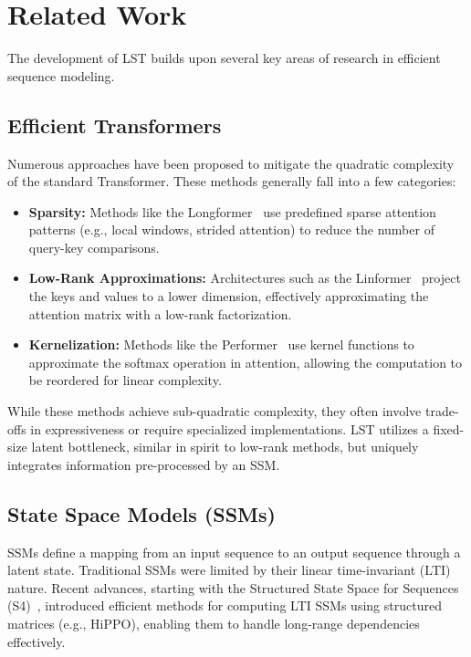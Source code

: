 \documentclass[10pt,twocolumn,letterpaper]{article}
\begin{document}
\section{Related Work}

The development of LST builds upon several key areas of research in efficient sequence modeling.

\subsection{Efficient Transformers}

Numerous approaches have been proposed to mitigate the quadratic complexity of the standard Transformer. These methods generally fall into a few categories:
\begin{itemize}
    \item \textbf{Sparsity:} Methods like the Longformer~\cite{beltagy2020longformer} use predefined sparse attention patterns (e.g., local windows, strided attention) to reduce the number of query-key comparisons.
    \item \textbf{Low-Rank Approximations:} Architectures such as the Linformer~\cite{wang2020linformer} project the keys and values to a lower dimension, effectively approximating the attention matrix with a low-rank factorization.
    \item \textbf{Kernelization:} Methods like the Performer~\cite{choromanski2020rethinking} use kernel functions to approximate the softmax operation in attention, allowing the computation to be reordered for linear complexity.
\end{itemize}
While these methods achieve sub-quadratic complexity, they often involve trade-offs in expressiveness or require specialized implementations. LST utilizes a fixed-size latent bottleneck, similar in spirit to low-rank methods, but uniquely integrates information pre-processed by an SSM.

\subsection{State Space Models (SSMs)}

SSMs define a mapping from an input sequence to an output sequence through a latent state. Traditional SSMs were limited by their linear time-invariant (LTI) nature. Recent advances, starting with the Structured State Space for Sequences (S4)~\cite{gu2021efficiently}, introduced efficient methods for computing LTI SSMs using structured matrices (e.g., HiPPO), enabling them to handle long-range dependencies effectively.
\end{document}
